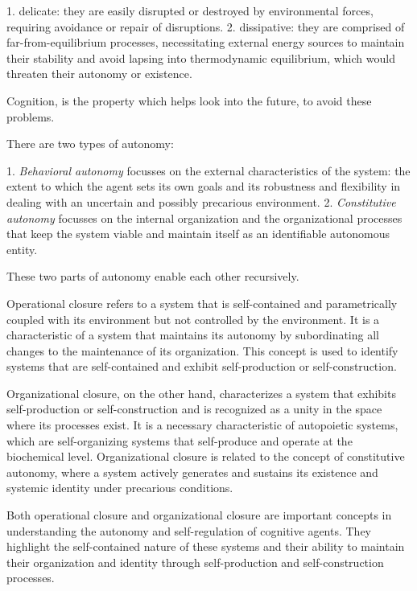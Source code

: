 1. delicate: they are easily disrupted or destroyed by environmental forces, requiring avoidance or repair of disruptions.
2. dissipative: they are comprised of far-from-equilibrium processes, necessitating external energy sources to maintain their stability and avoid lapsing into thermodynamic equilibrium, which would threaten their autonomy or existence.


Cognition, is the property which helps look into the future, to avoid these problems.

There are two types of autonomy:

1. \emph{Behavioral autonomy} focusses on the external characteristics of the system: the extent to which the agent sets its own goals and its robustness and flexibility in dealing with an uncertain and possibly precarious environment.
2. \emph{Constitutive autonomy} focusses on the internal organization and the organizational processes that keep the system viable and maintain itself as an identifiable autonomous entity.

These two parts of autonomy enable each other recursively.


Operational closure refers to a system that is self-contained and parametrically coupled with its environment but not controlled by the environment. It is a characteristic of a system that maintains its autonomy by subordinating all changes to the maintenance of its organization. This concept is used to identify systems that are self-contained and exhibit self-production or self-construction.

Organizational closure, on the other hand, characterizes a system that exhibits self-production or self-construction and is recognized as a unity in the space where its processes exist. It is a necessary characteristic of autopoietic systems, which are self-organizing systems that self-produce and operate at the biochemical level. Organizational closure is related to the concept of constitutive autonomy, where a system actively generates and sustains its existence and systemic identity under precarious conditions.

Both operational closure and organizational closure are important concepts in understanding the autonomy and self-regulation of cognitive agents. They highlight the self-contained nature of these systems and their ability to maintain their organization and identity through self-production and self-construction processes.

